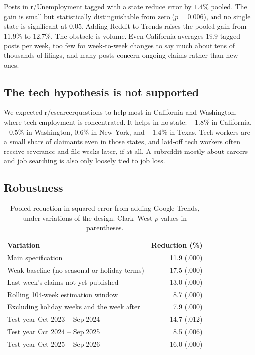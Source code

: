 \documentclass[sigconf,nonacm]{acmart}
\begin{document}
Posts in r/Unemployment tagged with a state reduce error by $1.4\%$ pooled. The gain is
small but statistically distinguishable from zero ($p=0.006$), and no single state is
significant at $0.05$. Adding Reddit to Trends raises the pooled gain from $11.9\%$ to
$12.7\%$. The obstacle is volume. Even California averages $19.9$ tagged posts per week,
too few for week-to-week changes to say much about tens of thousands of filings, and many
posts concern ongoing claims rather than new ones.

\subsection{The tech hypothesis is not supported}

We expected r/cscareerquestions to help most in California and Washington, where tech
employment is concentrated. It helps in no state: $-1.8\%$ in California, $-0.5\%$ in
Washington, $0.6\%$ in New York, and $-1.4\%$ in Texas. Tech workers are a small share of
claimants even in those states, and laid-off tech workers often receive severance and file
weeks later, if at all. A subreddit mostly about careers and job searching is also only
loosely tied to job loss.

\subsection{Robustness}
\label{sec:robust}

\begin{table}[t]
  \caption{Pooled reduction in squared error from adding Google Trends, under variations of
  the design. Clark--West $p$-values in parentheses.}
  \label{tab:robust}
  \small
  \begin{tabular}{lr}
    \toprule
    Variation & Reduction (\%) \\
    \midrule
    Main specification                          & 11.9 (.000) \\
    Weak baseline (no seasonal or holiday terms) & 17.5 (.000) \\
    Last week's claims not yet published         & 13.0 (.000) \\
    Rolling 104-week estimation window           & 8.7 (.000) \\
    Excluding holiday weeks and the week after   & 7.9 (.000) \\
    Test year Oct 2023 -- Sep 2024               & 14.7 (.012) \\
    Test year Oct 2024 -- Sep 2025               & 8.5 (.006) \\
    Test year Oct 2025 -- Sep 2026               & 16.0 (.000) \\
    \bottomrule
  \end{tabular}
\end{table}
\end{document}

